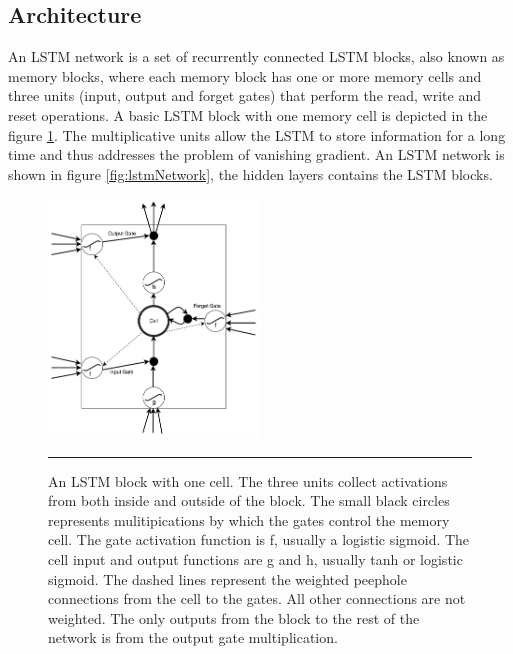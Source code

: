 \subsection{Architecture}
An LSTM network is a set of recurrently connected LSTM blocks, also known as memory blocks, where
each memory block has one or more memory cells and three units (input, output and forget gates)
that perform the read, write and reset operations. A basic LSTM block with one memory cell is
depicted in the figure \ref{fig:lstmBlock}. The multiplicative units allow the LSTM to store
information for a long time and thus addresses the problem of vanishing gradient. An LSTM network
is shown in figure \ref{fig:lstmNetwork}, the hidden layers contains the LSTM blocks.

\begin{figure}[htbp]
  \centering
    \includegraphics[width=0.5\textwidth,height=0.5\textheight,keepaspectratio]{Figures/lstm-block.pdf}
    \rule{35em}{0.5pt}
  \caption[An LSTM block with one cell]
{An LSTM block with one cell. The three units collect activations from both inside and outside of
the block. The small black circles represents mulitipications by which the gates control the
memory cell. The gate activation function is f, usually a logistic sigmoid. The cell input and
output functions are g and h, usually tanh or logistic sigmoid. The dashed lines represent the
weighted peephole connections from the cell to the gates. All other connections are not weighted.
The only outputs from the block to the rest of the network is from the output gate multiplication.}
  \label{fig:lstmBlock}
\end{figure}

